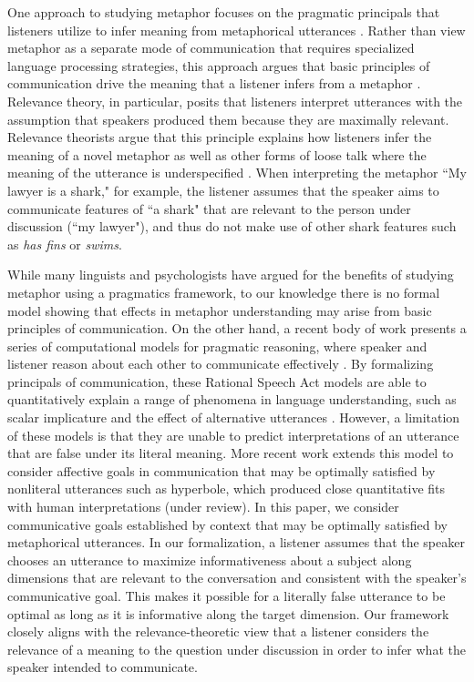 \documentclass[10pt,letterpaper]{article}
\begin{document}
One approach to studying metaphor focuses on the pragmatic principals that listeners utilize to infer meaning from metaphorical utterances \cite{tendahl2008complementary, stern2000metaphor}. Rather than view metaphor as a separate mode of communication that requires specialized language processing strategies, this approach argues that basic principles of communication drive the meaning that a listener infers from a metaphor \cite{sperber2008deflationary}. Relevance theory, in particular, posits that listeners interpret utterances with the assumption that speakers produced them because they are maximally relevant. Relevance theorists argue that this principle explains how listeners infer the meaning of a novel metaphor as well as other forms of loose talk where the meaning of the utterance is underspecified \cite{wilson2002relevance, wilson2006metaphor, sperber1985loose}. When interpreting the metaphor ``My lawyer is a shark," for example, the listener assumes that the speaker aims to communicate features of  ``a shark" that are relevant to the person under discussion (``my lawyer"), and thus do not make use of other shark features such as \emph{has fins} or \emph{swims}.

While many linguists and psychologists have argued for the benefits of studying metaphor using a pragmatics framework, to our knowledge there is no formal model showing that effects in metaphor understanding may arise from basic principles of communication. On the other hand, a recent body of work presents a series of computational models for pragmatic reasoning, where speaker and listener reason about each other to communicate effectively \cite{frank2012predicting, jager2009pragmatic}. By formalizing principals of communication, these Rational Speech Act models are able to quantitatively explain a range of phenomena in language understanding, such as scalar implicature and the effect of alternative utterances \cite{goodman2013knowledge, bergen2012s}. However, a limitation of these models is that they are unable to predict interpretations of an utterance that are false under its literal meaning. More recent work extends this model to consider affective goals in communication that may be optimally satisfied by nonliteral utterances such as hyperbole, which produced close quantitative fits with human interpretations (under review). In this paper, we consider communicative goals established by context that may be optimally satisfied by metaphorical utterances. In our formalization, a listener assumes that the speaker chooses an utterance to maximize informativeness about a subject along dimensions that are relevant to the conversation and consistent with the speaker's communicative goal. This makes it possible for a literally false utterance to be optimal as long as it is informative along the target dimension. Our framework closely aligns with the relevance-theoretic view that a listener considers the relevance of a meaning to the question under discussion in order to infer what the speaker intended to communicate. 
\end{document}
